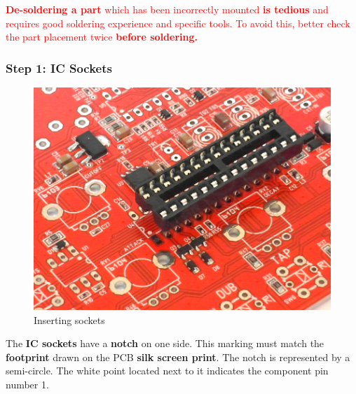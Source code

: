 \documentclass{scrartcl}
\begin{document}
\vspace{0.25cm}
\begin{tcolorbox}
    \textcolor{red}{
        \textbf{De-soldering a part} which has been incorrectly mounted \textbf{is tedious} and requires good soldering experience and specific tools. To avoid this, better check the part placement twice \textbf{before soldering.}
    }
\end{tcolorbox}

\pagebreak
\subsubsection{Step 1: IC Sockets}

\begin{figure}[!ht]
    \begin{center}
        \includegraphics[scale=0.30]{assets/ic-socket.jpg}
        \caption{Inserting sockets}
    \end{center}
\end{figure}

The \textbf{IC sockets} have a \textbf{notch} on one side.
This marking must match the \textbf{footprint} drawn on the PCB \textbf{silk screen print}. The notch is represented by a semi-circle. The white point located next to it indicates the component pin number 1.
\end{document}
